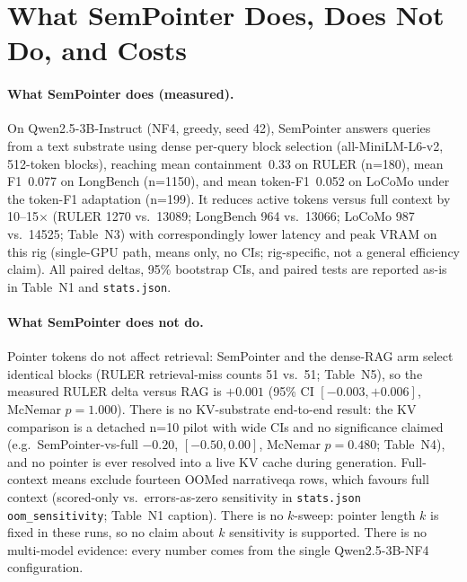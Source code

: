 \section{What SemPointer Does, Does Not Do, and Costs}
\label{sec:honest-claims}

\paragraph{What SemPointer does (measured).}
On Qwen2.5-3B-Instruct (NF4, greedy, seed 42), SemPointer answers queries from a text substrate using dense per-query block selection (all-MiniLM-L6-v2, 512-token blocks), reaching mean containment~0.33 on RULER (n=180), mean F1~0.077 on LongBench (n=1150), and mean token-F1~0.052 on LoCoMo under the token-F1 adaptation (n=199).
It reduces active tokens versus full context by 10--15$\times$ (RULER 1270 vs.\ 13089; LongBench 964 vs.\ 13066; LoCoMo 987 vs.\ 14525; Table~N3) with correspondingly lower latency and peak VRAM on this rig (single-GPU path, means only, no CIs; rig-specific, not a general efficiency claim).
All paired deltas, 95\% bootstrap CIs, and paired tests are reported as-is in Table~N1 and \texttt{stats.json}.

\paragraph{What SemPointer does not do.}
Pointer tokens do not affect retrieval: SemPointer and the dense-RAG arm select identical blocks (RULER retrieval-miss counts 51 vs.\ 51; Table~N5), so the measured RULER delta versus RAG is $+0.001$ (95\% CI $[-0.003,+0.006]$, McNemar $p=1.000$).
There is no KV-substrate end-to-end result: the KV comparison is a detached n=10 pilot with wide CIs and no significance claimed (e.g.\ SemPointer-vs-full $-0.20$, $[-0.50,0.00]$, McNemar $p=0.480$; Table~N4), and no pointer is ever resolved into a live KV cache during generation.
Full-context means exclude fourteen OOMed narrativeqa rows, which favours full context (scored-only vs.\ errors-as-zero sensitivity in \texttt{stats.json} \texttt{oom\_sensitivity}; Table~N1 caption).
There is no $k$-sweep: pointer length $k$ is fixed in these runs, so no claim about $k$ sensitivity is supported.
There is no multi-model evidence: every number comes from the single Qwen2.5-3B-NF4 configuration.

